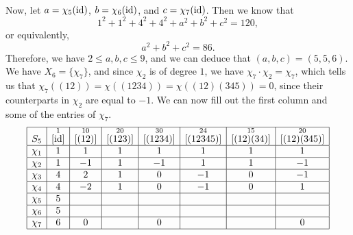 \begin{exmp}{}
\begin{align*}
    \end{align*}
    Now, let $a = \chi_5(\operatorname{id})$, $b = \chi_6(\operatorname{id})$, and $c = \chi_7(\operatorname{id})$. 
    Then we know that 
    \[ 1^2 + 1^2 + 4^2 + 4^2 + a^2 + b^2 + c^2 = 120, \] 
    or equivalently, 
    \[ a^2 + b^2 + c^2 = 86. \] 
    Therefore, we have $2 \leq a, b, c \leq 9$, and we can deduce that 
    $(a, b, c) = (5, 5, 6)$. We have $X_6 = \{\chi_7\}$, and since $\chi_2$ 
    is of degree $1$, we have $\chi_7 \cdot \chi_2 = \chi_7$, which tells us 
    that $\chi_7((12)) = \chi((1234)) = \chi((12)(345)) = 0$, since 
    their counterparts in $\chi_2$ are equal to $-1$. We can now fill out 
    the first column and some of the entries of $\chi_7$. 
    \begin{align*}
        \begin{array}{|c|c|c|c|c|c|c|c|}
            \hline
            S_5    & \overset{1}{[\operatorname{id}]} & \overset{10}{[(12)]} & \overset{20}{[(123)]} & \overset{30}{[(1234)]} & \overset{24}{[(12345)]} & \overset{15}{[(12)(34)]} & \overset{20}{[(12)(345)]} \\ \hline
            \chi_1 & 1                  & 1                    & 1                     & 1                      & 1                       & 1                        & 1                         \\ \hline
            \chi_2 & 1                  & -1                   & 1                     & -1                     & 1                       & 1                        & -1                        \\ \hline
            \chi_3 & 4                  & 2                    & 1                     & 0                      & -1                      & 0                        & -1                        \\ \hline
            \chi_4 & 4                  & -2                   & 1                     & 0                      & -1                      & 0                        & 1                         \\ \hline
            \chi_5 & 5                  &                      &                       &                        &                         &                          &                           \\ \hline
            \chi_6 & 5                  &                      &                       &                        &                         &                          &                           \\ \hline
            \chi_7 & 6                  & 0                    &                       & 0                      &                         &                          & 0                         \\ \hline

\end{array}
\end{align*}
\end{exmp}
